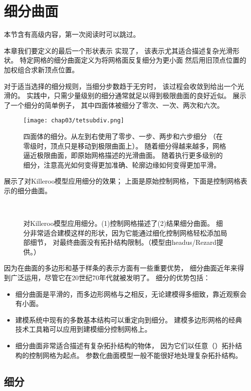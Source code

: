 \section{细分曲面}\label{sec:细分曲面}
\begin{remark}
    本节含有高级内容，第一次阅读时可以跳过。
\end{remark}

本章我们要定义的最后一个形状表示
实现了，
该表示尤其适合描述复杂光滑形状。
特定网格的细分曲面定义为将网格面反复细分为更小面
然后用旧顶点位置的加权组合求新顶点位置。

对于适当选择的细分规则，当细分步数趋于无穷时，
该过程会收敛到给出一个光滑的。
实践中，只需少量级别的细分通常就足以得到极限曲面的良好近似。
展示了一个细分的简单例子，
其中四面体被细分了零次、一次、两次和六次。
\begin{figure}[htbp]
    \centering\texttt{[image: chap03/tetsubdiv.png]}
    \caption{四面体的细分。从左到右使用了零步、一步、两步和六步细分
        （在零级时，顶点只是移动到极限曲面上）。
        随着细分得越来越多，网格逼近极限曲面，即原始网格描述的光滑曲面。
        随着执行更多级别的细分，注意高光如何变得更加准确、轮廓边缘如何变得更加平滑。}
    \label{fig:3.24}
\end{figure}

展示了对Killeroo模型应用细分的效果；
上面是原始控制网格，下面是控制网格表示的细分曲面。
\begin{figure}[htbp]
    \centering
    \\
    \caption{对Killeroo模型应用细分。(1)控制网格描述了(2)结果细分曲面。
        细分非常适合建模这样的形状，因为它能通过细化控制网格轻松添加局部细节，
        对最终曲面没有拓扑结构限制。（模型由headus/Rezard提供。）}
    \label{fig:3.25}
\end{figure}


因为在曲面的多边形和基于样条的表示方面有一些重要优势，
细分曲面近年来得到广泛运用，尽管它在20世纪70年代就被发明了。
细分的优势包括：
\begin{itemize}
    \item 细分曲面是平滑的，而多边形网格与之相反，无论建模得多细致，靠近观察会有小面。
    \item 建模系统中现有的多数基本结构可以重定向到细分。
          建模多边形网格的经典技术工具箱可以应用到建模细分控制网格上。
    \item 细分曲面非常适合描述有复杂拓扑结构的物体，
          因为它们以任意（）拓扑结构的控制网格为起点。
          参数化曲面模型一般不能很好地处理复杂拓扑结构。
\end{itemize}
\subsection{细分}\label{sub:细分}
